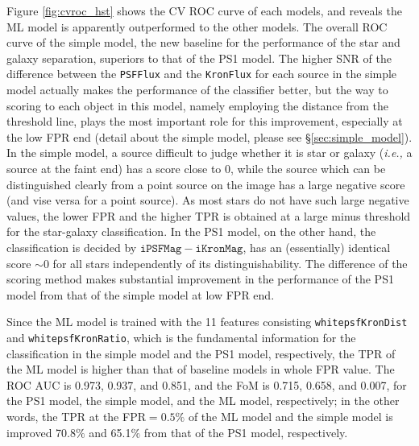 \documentclass[twocolumn]{aastex62}
\begin{document}
{Figure \ref{fig:cvroc_hst} shows the CV ROC curve of each models, 
and reveals the ML model is apparently outperformed to the other models. 
The overall ROC curve of the simple model, the new baseline for the performance of the star and galaxy separation, 
superiors to that of the PS1 model. 
The higher SNR of the difference between 
the \texttt{PSFFlux} and the \texttt{KronFlux} for each source 
in the simple model actually makes the performance of the classifier better, 
but the way to scoring to each object in this model, namely employing the distance from the threshold line, 
plays the most important role for this improvement, 
especially at the low FPR end (detail about the simple model, please see \S\ref{sec:simple_model}). 
In the simple model, a source difficult to judge whether it is star or galaxy ({\it i.e.,} a source at the faint end) 
has a score close to 0, 
while the source which can be distinguished clearly from a point source on the image 
has a large negative score (and vise versa for a point source). 
As most stars do not have such large negative values, 
the lower FPR and the higher TPR is obtained at a large minus threshold for the star-galaxy classification. 
In the PS1 model, on the other hand, the classification is decided by $\mathtt{iPSFMag} - \mathtt{iKronMag}$, 
has an (essentially) identical score $\sim$0 for all stars independently of its distinguishability. 
The difference of the scoring method makes substantial improvement in the performance of the PS1 model 
from that of the simple model at low FPR end. 

Since the ML model is trained with the 11 features 
consisting \texttt{whitepsfKronDist} and \texttt{whitepsfKronRatio}, 
which is the fundamental information for the classification in the  simple model and the PS1 model, respectively, 
the TPR of the ML model is higher than that of baseline models in whole FPR value. 
The ROC AUC is 0.973, 0.937, and 0.851, 
and the FoM is 0.715, 0.658, and 0.007, 
for the PS1 model, the simple model, and the ML model, respectively; 
in the other words, the TPR at the FPR$=0.5\%$ of the ML model and the simple model 
is improved 70.8$\%$ and 65.1$\%$ from that of the PS1 model, respectively. 

}
\end{document}
